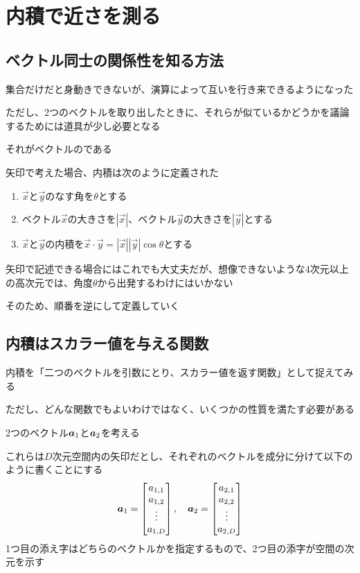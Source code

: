 \documentclass[../book_half_step_linear]{subfiles}
\begin{document}
\section{内積で近さを測る}

\subsection{ベクトル同士の関係性を知る方法}

集合だけだと身動きできないが、演算によって互いを行き来できるようになった

ただし、2つのベクトルを取り出したときに、それらが似ているかどうかを議論するためには道具が少し必要となる

それがベクトルのである

\br

矢印で考えた場合、内積は次のように定義された
\begin{enumerate}
  \item $\overrightarrow{x}$と$\overrightarrow{y}$のなす角を$\theta$とする
  \item ベクトル$\overrightarrow{x}$の大きさを$|\overrightarrow{x}|$、ベクトル$\overrightarrow{y}$の大きさを$|\overrightarrow{y}|$とする
  \item $\overrightarrow{x}$と$\overrightarrow{y}$の内積を$\overrightarrow{x} \cdot \overrightarrow{y} = |\overrightarrow{x}||\overrightarrow{y}|\cos \theta$とする
\end{enumerate}
矢印で記述できる場合にはこれでも大丈夫だが、想像できないような4次元以上の高次元では、角度$\theta$から出発するわけにはいかない

そのため、順番を逆にして定義していく

\sectionline
\subsection{内積はスカラー値を与える関数}

内積を「二つのベクトルを引数にとり、スカラー値を返す関数」として捉えてみる

ただし、どんな関数でもよいわけではなく、いくつかの性質を満たす必要がある

\br

2つのベクトル$\vb*{a}_1$と$\vb*{a}_2$を考える

これらは$D$次元空間内の矢印だとし、それぞれのベクトルを成分に分けて以下のように書くことにする
\begin{equation*}
  \vb*{a}_1 = \begin{bmatrix} a_{1,1} \\ a_{1,2} \\ \vdots \\ a_{1,D} \end{bmatrix}, \quad \vb*{a}_2 = \begin{bmatrix} a_{2,1} \\ a_{2,2} \\ \vdots \\ a_{2,D} \end{bmatrix}
\end{equation*}
1つ目の添え字はどちらのベクトルかを指定するもので、2つ目の添字が空間の次元を示す
\end{document}
